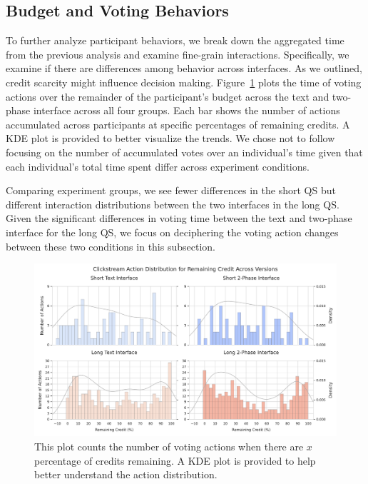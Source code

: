 \subsection{Budget and Voting Behaviors}
To further analyze participant behaviors, we break down the aggregated time from the previous analysis and examine fine-grain interactions. Specifically, we examine if there are differences among behavior across interfaces. As we outlined, credit scarcity might influence decision making.  Figure~\ref{fig:voting_all} plots the time of voting actions over the remainder of the participant's budget across the text and two-phase interface across all four groups. Each bar shows the number of actions accumulated across participants at specific percentages of remaining credits. A KDE plot is provided to better visualize the trends. We chose not to follow ~\textcite{quarfoot2017quadratic} focusing on the number of accumulated votes over an individual's time given that each individual's total time spent differ across experiment conditions.

Comparing experiment groups, we see fewer differences in the short QS but different interaction distributions between the two interfaces in the long QS. Given the significant differences in voting time between the text and two-phase interface for the long QS, we focus on deciphering the voting action changes between these two conditions in this subsection.

\begin{figure}[ht]
    \centering
    \includegraphics[width=\textwidth]{content/image/results/clickstream_action_distribution.pdf}
    \caption{This plot counts the number of voting actions when there are $x$ percentage of credits remaining. A KDE plot is provided to help better understand the action distribution.}
    \label{fig:voting_all}
\end{figure}

